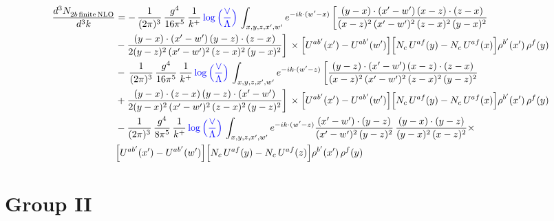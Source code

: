 \documentclass[9pt]{article}
\numberwithin{equation}{section}
\begin{document}
\begin{align}
    \frac{d^{3}N_{2b\,\rm finite\, NLO}^{\rm}}{d^{3}k} & =  -\, \frac{1}{(2\pi)^{3}}\,\frac{g^{4}}{16\pi^{5}}\,\frac{1}{k^{+}}\,{\color{blue}\log{\left(\frac{\vee}{\Lambda}\right)}}\,\int_{x,y,z,x',w'}e^{-ik\cdot(w'-x)}\, \bigg[\frac{(y-x)\cdot (x'-w')\,(x-z)\cdot (z-x)}{(x-z)^{2}\,(x'-w')^{2}\,(z-x)^{2}\,(y-x)^{2}}\notag \\ & -\frac{(y-x)\cdot (x'-w')\,(y-z)\cdot (z-x)}{2(y-z)^{2}\,(x'-w')^{2}\,(z-x)^{2}\,(y-x)^{2}}\bigg]\,\times \Big[U^{ab'}(x')-U^{ab'}(w')\Big]\Big[N_{c}\,U^{af}(y)-N_{c}\,U^{af}(x)\Big]\rho^{b'}(x')\,\rho^{f}(y)\notag \\ & -\, \frac{1}{(2\pi)^{3}}\,\frac{g^{4}}{16\pi^{5}}\,\frac{1}{k^{+}}\,{\color{blue}\log{\left(\frac{\vee}{\Lambda}\right)}}\,\int_{x,y,z,x',w'}e^{-ik\cdot(w'-z)}\,\bigg[\frac{(y-z)\cdot (x'-w')\,(x-z)\cdot (z-x)}{(x-z)^{2}\,(x'-w')^{2}\,(z-x)^{2}\,(y-z)^{2}}\notag \\ & +\frac{(y-x)\cdot (z-x)\,(y-z)\cdot (x'-w')}{2(y-x)^{2}\,(x'-w')^{2}\,(z-x)^{2}\,(y-z)^{2}}\bigg]\,\times \Big[U^{ab'}(x')-U^{ab'}(w')\Big]\Big[N_{c}\,U^{af}(y)-N_{c}\,U^{af}(x)\Big]\rho^{b'}(x')\,\rho^{f}(y)\notag \\ & - \frac{1}{(2\pi)^{3}}\,\frac{g^{4}}{8\pi^{5}}\,\frac{1}{k^{+}}\,{\color{blue}\log{\left(\frac{\vee}{\Lambda}\right)}}\,\int_{x,y,z,x',w'}e^{-ik\cdot(w'-z)} \frac{(x'-w')\cdot(y-z)}{(x'-w')^{2}\,(y-z)^{2}}\,\frac{(y-x)\cdot(y-z)}{(y-x)^{2}\,(x-z)^{2}}\times\notag \\ & \Big[U^{ab'}(x')-U^{ab'}(w')\Big]\Big[N_{c}\,U^{af}(y)-N_{c}\,U^{af}(z)\Big]\rho^{b'}(x')\,\rho^{f}(y)
\end{align}
\section{Group II}
\end{document}
